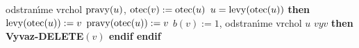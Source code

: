 \phantom{------}odstran\'\i me vrchol $\operatorname{pravy}(u)$, $\operatorname{otec}(v):=\operatorname{otec}(u)$\newline
\phantom{------}{\bf if} $u=\operatorname{levy}(\operatorname{otec}(u))$ {\bf then}\newline 
\phantom{---------}$\operatorname{levy}(\operatorname{otec}(u)):=v$\newline 
\phantom{------}{\bf else}\newline 
\phantom{---------}$\operatorname{pravy}(\operatorname{otec}(u)):=v$\newline 
\phantom{------}{\bf endif}\newline 
\phantom{------}$b(v):=1$, odstran\'\i me vrchol $u$\newline 
\phantom{---}{\bf endif} \newline 
\phantom{---}{\bf if} $vyv$ {\bf then Vyvaz-DELETE$(v)$ endif\newline 
endif}
\medskip

